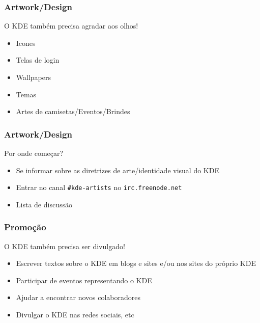 \documentclass[hyperref={pdfpagelabels=false}]{beamer}
\begin{document}
\begin{frame}
   \frametitle{Artwork/Design}
   \begin{center}
      \begin{block}{}
         \begin{center}
            O KDE também precisa agradar aos olhos!
         \end{center}
      \end{block}
   \end{center}
   \begin{itemize}
      \item Icones
      \item Telas de login
      \item Wallpapers
      \item Temas
      \item Artes de camisetas/Eventos/Brindes
   \end{itemize}
\end{frame}
\begin{frame}
   \frametitle{Artwork/Design}
   Por onde começar?
   \begin{itemize}
      \item Se informar sobre as diretrizes de arte/identidade visual do KDE
      \item Entrar no canal {\tt{\#kde-artists}} no {\tt{irc.freenode.net}}
      \item Lista de discussão
   \end{itemize}
\end{frame}
\begin{frame}
   \frametitle{Promoção}
   \begin{center}
      \begin{block}{}
         \begin{center}
            O KDE também precisa ser divulgado!
         \end{center}
      \end{block}
   \end{center}
   \begin{itemize}
      \item Escrever textos sobre o KDE em blogs e sites e/ou nos sites do próprio KDE
      \item Participar de eventos representando o KDE
      \item Ajudar a encontrar novos colaboradores
      \item Divulgar o KDE nas redes sociais, etc
   \end{itemize}
\end{frame}
\end{document}
